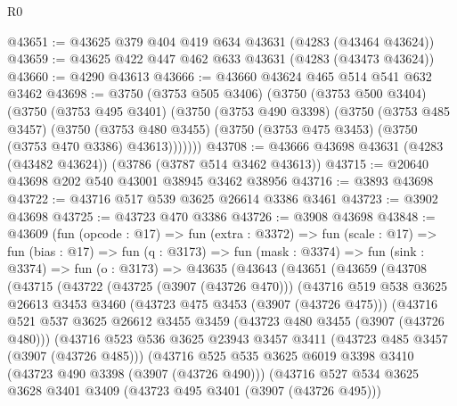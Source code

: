 \begin{lexlean}{R0}
\begin{coremodule}
@43651 := @43625 @379 @404 @419 @634 @43631 (@4283 (@43464 @43624))
@43659 := @43625 @422 @447 @462 @633 @43631 (@4283 (@43473 @43624))
@43660 := @4290 @43613
@43666 := @43660 @43624 @465 @514 @541 @632 @3462
@43698 := @3750
    (@3753 @505 @3406)
    (@3750
      (@3753 @500 @3404)
      (@3750
        (@3753 @495 @3401)
        (@3750
          (@3753 @490 @3398)
          (@3750
            (@3753 @485 @3457)
            (@3750
              (@3753 @480 @3455)
              (@3750 (@3753 @475 @3453) (@3750 (@3753 @470 @3386) @43613)))))))
@43708 := @43666 @43698 @43631 (@4283 (@43482 @43624)) (@3786 (@3787 @514 @3462 @43613))
@43715 := @20640 @43698 @202 @540 @43001 @38945 @3462 @38956
@43716 := @3893 @43698
@43722 := @43716 @517 @539 @3625 @26614 @3386 @3461
@43723 := @3902 @43698
@43725 := @43723 @470 @3386
@43726 := @3908 @43698
@43848 := @43609
    (fun (opcode : @17) =>
    fun (extra : @3372) =>
    fun (scale : @17) =>
    fun (bias : @17) =>
    fun (q : @3173) =>
    fun (mask : @3374) =>
    fun (sink : @3374) =>
    fun (o : @3173) =>
    @43635
      (@43643
        (@43651
          (@43659
            (@43708
              (@43715
                (@43722
                  (@43725 (@3907 (@43726 @470)))
                  (@43716
                    @519
                    @538
                    @3625
                    @26613
                    @3453
                    @3460
                    (@43723 @475 @3453 (@3907 (@43726 @475)))
                    (@43716
                      @521
                      @537
                      @3625
                      @26612
                      @3455
                      @3459
                      (@43723 @480 @3455 (@3907 (@43726 @480)))
                      (@43716
                        @523
                        @536
                        @3625
                        @23943
                        @3457
                        @3411
                        (@43723 @485 @3457 (@3907 (@43726 @485)))
                        (@43716
                          @525
                          @535
                          @3625
                          @6019
                          @3398
                          @3410
                          (@43723 @490 @3398 (@3907 (@43726 @490)))
                          (@43716
                            @527
                            @534
                            @3625
                            @3628
                            @3401
                            @3409
                            (@43723 @495 @3401 (@3907 (@43726 @495)))

\end{coremodule}
\end{lexlean}

